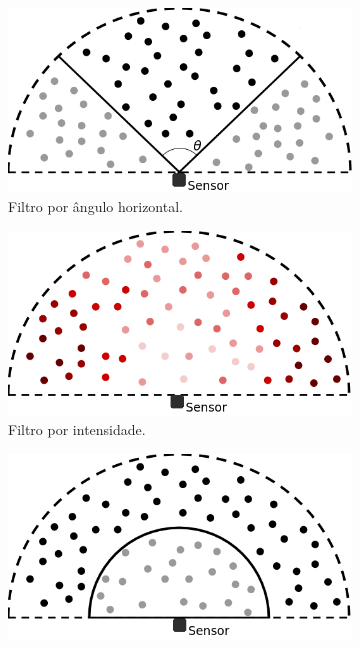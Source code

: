 \begin{figure}[H]
    \centering
    \begin{subfigure}[t]{0.4\textwidth}
        \includegraphics[width=\textwidth]{dados/figuras/angle_filter.png}
        \caption{Filtro por ângulo horizontal.}
        \label{fig:angle_filter}
    \end{subfigure}
    \hspace{3em}
    \begin{subfigure}[t]{0.4\textwidth}
        \includegraphics[width=\textwidth]{dados/figuras/intensity_filter.png}
        \caption{Filtro por intensidade.}
        \label{fig:intensity_filter}
    \end{subfigure}
    \begin{subfigure}[t]{0.4\textwidth}
        \includegraphics[width=\textwidth]{dados/figuras/distance_filter.png}

\end{subfigure}
\end{figure}

